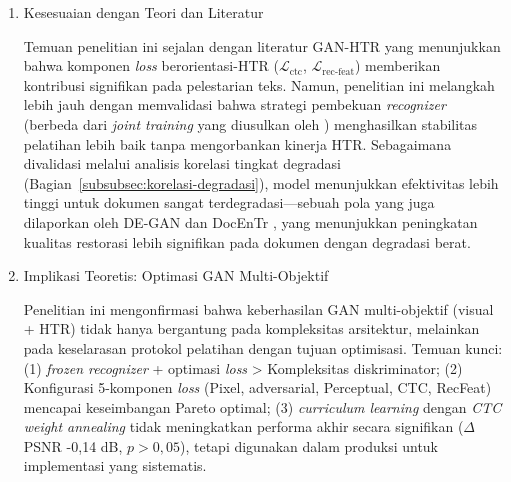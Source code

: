 \documentclass[12pt,a4paper]{article}
\begin{document}
\begin{enumerate}[leftmargin=1.5em, labelsep=0.5em, itemindent=0pt, label=\arabic*., topsep=0pt, partopsep=0pt]
    Studi ablasi mengungkapkan bahwa arsitektur diskriminator dual-modal menunjukkan kontribusi marginal ($\Delta$PSNR +0,28 dB, $\Delta$CER -0,01\%, $p>0,05$). Sebagaimana dianalisis pada Bagian~\ref{subsubsec:kontribusi-dual-modal}, kontribusi marginal ini disebabkan oleh keterbatasan implementasi (misalnya, penggunaan teks prediksi berderau dan bobot \textit{adversarial} yang rendah), bukan karena keterbatasan konseptual arsitektur. Temuan ini memberikan wawasan teoretis bahwa dalam optimisasi GAN multi-objektif, protokol pelatihan dan strategi seperti \textit{frozen recognizer} lebih dominan daripada penambahan kompleksitas pada arsitektur diskriminator. Secara praktis, hal ini menunjukkan bahwa arsitektur CNN tunggal yang lebih efisien adalah pilihan yang lebih rasional untuk tugas ini, menjadikan komponen dual-modal sebagai kandidat utama untuk penyederhanaan model di masa depan.

    \item Kesesuaian dengan Teori dan Literatur
    
    Temuan penelitian ini sejalan dengan literatur GAN-HTR yang menunjukkan bahwa komponen \textit{loss} berorientasi-HTR ($\mathcal{L}_{\text{ctc}}$, $\mathcal{L}_{\text{rec-feat}}$) memberikan kontribusi signifikan pada pelestarian teks. Namun, penelitian ini melangkah lebih jauh dengan memvalidasi bahwa strategi pembekuan \textit{recognizer} (berbeda dari \textit{joint training} yang diusulkan oleh \textcite{souibgui2022}) menghasilkan stabilitas pelatihan lebih baik tanpa mengorbankan kinerja HTR. Sebagaimana divalidasi melalui analisis korelasi tingkat degradasi (Bagian~\ref{subsubsec:korelasi-degradasi}), model menunjukkan efektivitas lebih tinggi untuk dokumen sangat terdegradasi---sebuah pola yang juga dilaporkan oleh DE-GAN \parencite{souibgui2021} dan DocEnTr \parencite{souibgui2022docentr}, yang menunjukkan peningkatan kualitas restorasi lebih signifikan pada dokumen dengan degradasi berat.

    \item Implikasi Teoretis: Optimasi GAN Multi-Objektif
    
    Penelitian ini mengonfirmasi bahwa keberhasilan GAN multi-objektif (visual + HTR) tidak hanya bergantung pada kompleksitas arsitektur, melainkan pada keselarasan protokol pelatihan dengan tujuan optimisasi. Temuan kunci: (1) \textit{frozen recognizer} + optimasi \textit{loss} > Kompleksitas diskriminator; (2) Konfigurasi 5-komponen \textit{loss} (Pixel, adversarial, Perceptual, CTC, RecFeat) mencapai keseimbangan Pareto optimal; (3) \textit{curriculum learning} dengan \textit{CTC weight annealing} tidak meningkatkan performa akhir secara signifikan ($\Delta$PSNR -0,14 dB, $p>0,05$), tetapi digunakan dalam produksi untuk implementasi yang sistematis.


\end{enumerate}
\end{document}

